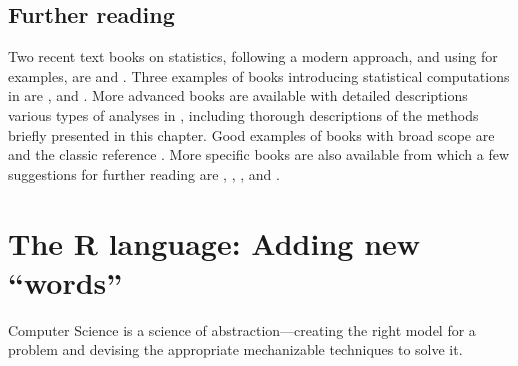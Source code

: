 \documentclass[krantz2]{krantz}\usepackage{knitr}
\begin{document}

%
%
%

\section{Further reading}\label{sec:stat:further:reading}

Two recent text books on statistics, following a modern approach, and using \Rlang for examples, are  \autocite{Diez2019} and  \autocite{Holmes2019}. Three examples of books introducing statistical computations in \Rlang are  \autocite{Dalgaard2008},  \autocite{Everitt2009} and  \autocite{Zuur2009}. More advanced books are available with detailed descriptions various types of analyses in \Rlang, including thorough descriptions of the methods briefly presented in this chapter. Good examples of books with broad scope are  \autocite{Crawley2012} and the classic reference  \autocite{Venables2002}. More specific books are also available from which a few suggestions for further reading are  \autocite{Everitt2011},  \autocite{Faraway2004},  \autocite{Faraway2006},  \autocite{Pinheiro2000} and  \autocite{Wood2017}.






\chapter{The R language: Adding new ``words''}\label{chap:R:functions}

\begin{VF}
Computer Science is a science of abstraction---creating the right model for a problem and devising the appropriate mechanizable techniques to solve it.

\nocite{Aho1992}
\end{VF}
\end{document}

